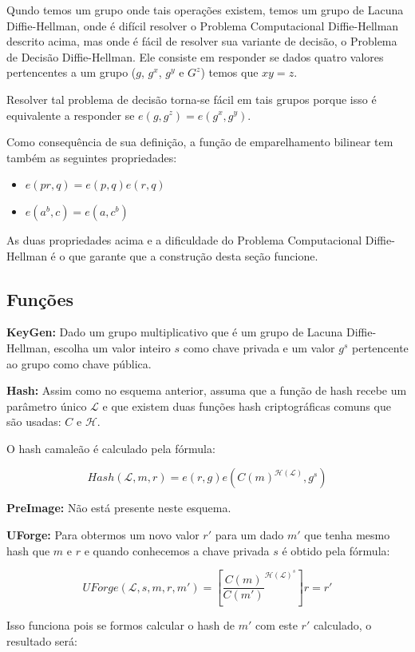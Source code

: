 \documentclass[a4paper]{article}
\begin{document}
Qundo temos um grupo onde tais operações existem, temos um grupo de
Lacuna Diffie-Hellman, onde é difícil resolver o Problema
Computacional Diffie-Hellman descrito acima, mas onde é fácil de
resolver sua variante de decisão, o Problema de Decisão
Diffie-Hellman. Ele consiste em responder se dados quatro valores
pertencentes a um grupo ($g$, $g^x$, $g^y$ e $G^z$) temos que $xy=z$.

Resolver tal problema de decisão torna-se fácil em tais grupos porque
isso é equivalente a responder se $e(g, g^z) = e(g^x, g^y)$.

Como consequência de sua definição, a função de emparelhamento
bilinear tem também as seguintes propriedades:

\begin{itemize}
\item$e(pr, q) = e(p, q)e(r, q)$
\item$e(a^b, c) = e(a, c^b)$
\end{itemize}

As duas propriedades acima e a dificuldade do Problema Computacional
Diffie-Hellman é o que garante que a construção desta seção funcione.

\subsection{Funções}

\textbf{KeyGen: }Dado um grupo multiplicativo que é um grupo de Lacuna
Diffie-Hellman, escolha um valor inteiro $s$ como chave privada e um
valor $g^s$ pertencente ao grupo como chave pública.

\textbf{Hash: } Assim como no esquema anterior, assuma que a função de
hash recebe um parâmetro único $\mathcal{L}$ e que existem duas
funções hash criptográficas comuns que são usadas: $C$ e
$\mathcal{H}$.

O hash camaleão é calculado  pela fórmula:

$$
Hash(\mathcal{L}, m, r) = e(r, g)e(C(m)^{\mathcal{H}(\mathcal{L})}, g^s)
$$

\textbf{PreImage:} Não está presente neste esquema.

\textbf{UForge:} Para obtermos um novo valor $r'$ para um dado $m'$
que tenha mesmo hash que $m$ e $r$ e quando conhecemos a chave privada
$s$ é obtido pela fórmula:

$$
UForge(\mathcal{L}, s, m, r, m') = \left[\frac{C(m)}{C(m')}^{\mathcal{H}(\mathcal{L})^s}\right]r = r'
$$

Isso funciona pois se formos calcular o hash de $m'$ com este $r'$
calculado, o resultado será:
\end{document}
